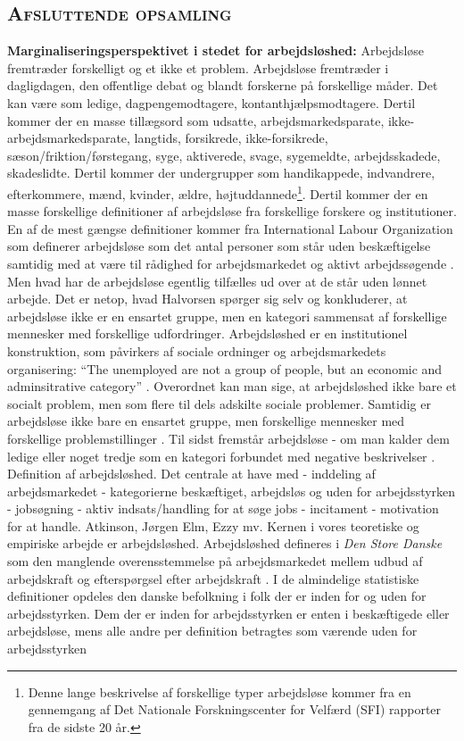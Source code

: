 \newpage \subsection{\textsc{Afsluttende opsamling}}

\textbf{Marginaliseringsperspektivet i stedet for arbejdsløshed:} Arbejdsløse fremtræder forskelligt og et ikke et problem. Arbejdsløse fremtræder i dagligdagen, den offentlige debat og blandt forskerne på forskellige måder. Det kan være som ledige, dagpengemodtagere, kontanthjælpsmodtagere. Dertil kommer der en masse tillægsord som udsatte, arbejdsmarkedsparate, ikke-arbejdsmarkedsparate, langtids, forsikrede, ikke-forsikrede, sæson/friktion/førstegang, syge, aktiverede, svage, sygemeldte, arbejdsskadede, skadeslidte. Dertil kommer der undergrupper som handikappede, indvandrere, efterkommere, mænd, kvinder, ældre, højtuddannede\footnote{Denne lange beskrivelse af forskellige typer arbejdsløse kommer fra en gennemgang af Det Nationale Forskningscenter for Velfærd (SFI) rapporter fra de sidste 20 år.}. Dertil kommer der en masse forskellige definitioner af arbejdsløse fra forskellige forskere og institutioner. En af de mest gængse definitioner kommer fra International Labour Organization som definerer arbejdsløse som det antal personer som står uden beskæftigelse samtidig med at være til rådighed for arbejdsmarkedet og aktivt arbejdssøgende \parencite{ILO1982}. Men hvad har de arbejdsløse egentlig tilfælles ud over at de står uden lønnet arbejde. Det er netop, hvad Halvorsen spørger sig selv og konkluderer, at arbejdsløse ikke er en ensartet gruppe, men en kategori sammensat af forskellige mennesker med forskellige udfordringer.  Arbejdsløshed er en institutionel konstruktion, som påvirkers af sociale ordninger og arbejdsmarkedets organisering: “The unemployed are not a group of people, but an economic and adminsitrative category” \parencite{Kelvin1985} \parencite[18]{Halvorsen1999}. Overordnet kan man sige, at arbejdsløshed ikke bare et socialt problem, men som flere til dels adskilte sociale problemer. Samtidig er arbejdsløse ikke bare en ensartet gruppe, men forskellige mennesker med forskellige problemstillinger . Til sidst fremstår arbejdsløse - om man kalder dem ledige eller noget tredje som en kategori forbundet med negative beskrivelser \parencite[12]{Halvorsen1999}. Definition af arbejdsløshed. Det centrale at have med - inddeling af arbejdsmarkedet - kategorierne beskæftiget, arbejdsløs og uden for arbejdsstyrken - jobsøgning - aktiv indsats/handling for at søge jobs - incitament - motivation for at handle. Atkinson, Jørgen Elm, Ezzy mv. Kernen i vores teoretiske og empiriske arbejde er arbejdsløshed. Arbejdsløshed defineres i \textit{Den Store Danske} som den manglende overensstemmelse på arbejdsmarkedet mellem udbud af arbejdskraft og efterspørgsel efter arbejdskraft \parencite{2015}. I de almindelige statistiske definitioner opdeles den danske befolkning i folk der er inden for og uden for arbejdsstyrken. Dem der er inden for arbejdsstyrken er enten i beskæftigede eller arbejdsløse, mens alle andre per definition betragtes som værende uden for arbejdsstyrken 